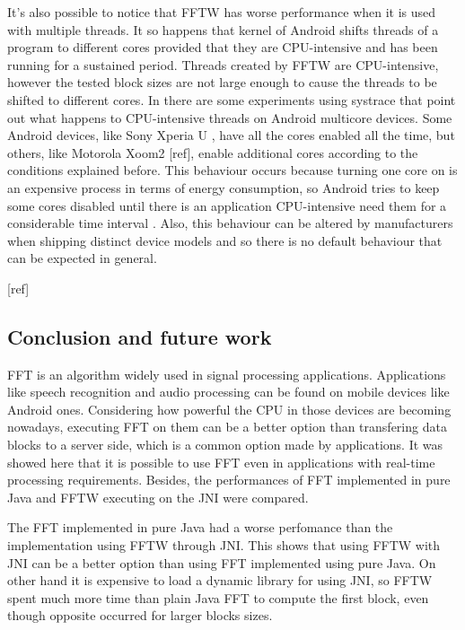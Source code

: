 \documentclass[12pt]{article}
\begin{document}
It's also possible to notice that FFTW has worse performance when it is used
with multiple threads. It so happens that kernel of Android shifts threads
of a program to different cores provided that they are CPU-intensive and has
been running for a sustained period. Threads created by FFTW are
CPU-intensive, however the tested block sizes are not large enough to cause the
threads to be shifted to different cores. In \cite{systrace}
there are some experiments using systrace
\cite{systraceandroid} that point out
what happens to CPU-intensive threads on Android multicore devices. Some
Android devices, like Sony Xperia U \cite{xperiauspecs}, have all the cores enabled all the time,
but others, like Motorola Xoom2 [ref], enable additional cores according to the conditions
explained before. This behaviour occurs because turning one core on
is an expensive process in terms of energy consumption, so Android tries to keep  some cores
disabled until there is an application CPU-intensive need them for a considerable
time interval \cite{systrace}. Also, this behaviour can be altered by manufacturers when shipping distinct device models and so there is no default behaviour that can be expected in general.



[ref] 


\subsection{ Conclusion and future work}

FFT is an algorithm widely used in signal processing applications. Applications like speech recognition
and audio processing can be found on mobile devices like Android ones. Considering how powerful the CPU
in those devices are becoming nowadays, executing FFT on them can be a better option than transfering data
blocks to a server side, which is a common option made by applications. It was showed here that it is possible to use FFT even in applications with
real-time processing requirements. Besides, the performances of FFT implemented in pure Java and
FFTW executing on the JNI were compared.

The FFT implemented in pure Java had a worse perfomance than the implementation using FFTW through JNI. This shows that using FFTW with JNI can be a better option than using FFT implemented using pure Java. On other hand it is expensive to load a dynamic library for using JNI, so FFTW spent much more time than plain Java FFT to compute the first block, even though opposite occurred for larger blocks sizes.
\end{document}
